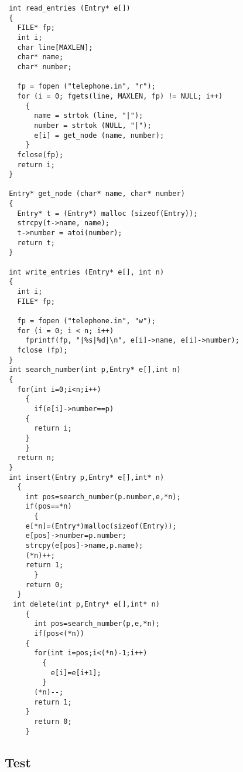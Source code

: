 \documentclass[11pt]{article}
\begin{document}
\begin{verbatim}
 int read_entries (Entry* e[])
 {
   FILE* fp;
   int i;
   char line[MAXLEN];
   char* name;
   char* number;

   fp = fopen ("telephone.in", "r");
   for (i = 0; fgets(line, MAXLEN, fp) != NULL; i++)
     {
       name = strtok (line, "|");
       number = strtok (NULL, "|");
       e[i] = get_node (name, number);
     }
   fclose(fp);
   return i;
 }

 Entry* get_node (char* name, char* number)
 {
   Entry* t = (Entry*) malloc (sizeof(Entry));
   strcpy(t->name, name);
   t->number = atoi(number);
   return t;
 }

 int write_entries (Entry* e[], int n)
 {
   int i;
   FILE* fp;

   fp = fopen ("telephone.in", "w");
   for (i = 0; i < n; i++)
     fprintf(fp, "|%s|%d|\n", e[i]->name, e[i]->number);
   fclose (fp);
 }
 int search_number(int p,Entry* e[],int n)
 {
   for(int i=0;i<n;i++)
     {
       if(e[i]->number==p)
	 {
	   return i;
	 }
     }
   return n;
 }
 int insert(Entry p,Entry* e[],int* n)
   {
     int pos=search_number(p.number,e,*n);
     if(pos==*n)
       {
	 e[*n]=(Entry*)malloc(sizeof(Entry));
	 e[pos]->number=p.number;
	 strcpy(e[pos]->name,p.name);
	 (*n)++;
	 return 1;
       }
     return 0;
   }
  int delete(int p,Entry* e[],int* n)
     {
       int pos=search_number(p,e,*n);
       if(pos<(*n))
	 {
	   for(int i=pos;i<(*n)-1;i++)
	     {
	       e[i]=e[i+1];
	     }
	   (*n)--;
	   return 1;
	 }
       return 0;
     }
\end{verbatim}
\subsection{Test}
\label{sec-5-1}
\end{document}
